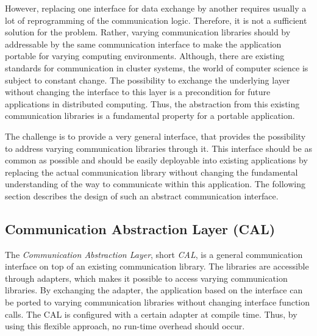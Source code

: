 However, replacing one interface for data exchange by another requires
usually a lot of reprogramming of the communication logic. Therefore,
it is not a sufficient solution for the problem.  Rather, varying
communication libraries should by addressable by the same
communication interface to make the application portable for varying
computing environments. Although, there are existing standards for
communication in cluster systems, the world of computer science is
subject to constant change.  The possibility to exchange the
underlying layer without changing the interface to this layer is a
precondition for future applications in distributed computing.  Thus,
the abstraction from this existing communication libraries is a
fundamental property for a portable application.

The challenge is to provide a very general interface, that provides
the possibility to address varying communication libraries through it.
This interface should be as common as possible and should be easily
deployable into existing applications by replacing the actual
communication library without changing the fundamental understanding
of the way to communicate within this application. The following
section describes the design of such an abstract communication
interface.


\subsection{Communication Abstraction Layer (CAL)}
\label{sec:cal}

The \textit{Communication Abstraction Layer}, short \textit{CAL}, is a
general communication interface on top of an existing communication
library. The libraries are accessible through adapters, which makes it
possible to access varying communication libraries. By exchanging the
adapter, the application based on the interface can be ported to
varying communication libraries without changing interface function
calls. The CAL is configured with a certain adapter at compile
time. Thus, by using this flexible approach, no run-time overhead
should occur.

